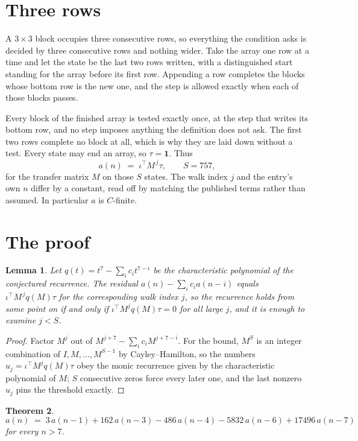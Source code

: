 \documentclass[11pt,a4paper]{article}
\theoremstyle{plain}
\newtheorem{theorem}{Theorem}
\newtheorem{lemma}[theorem]{Lemma}
\theoremstyle{definition}
\begin{document}
\section{Three rows}

A $3\times3$ block occupies three consecutive rows, so everything the condition asks is decided
by three consecutive rows and nothing wider. Take the array one row at a time and let the state
be the last two rows written, with a distinguished start standing for the array before its
first row. Appending a row completes the blocks whose bottom row is the new one, and the step
is allowed exactly when each of those blocks passes.

Every block of the finished array is tested exactly once, at the step that writes its bottom
row, and no step imposes anything the definition does not ask. The first two rows complete no
block at all, which is why they are laid down without a test. Every state may end an array, so
$\tau=\mathbf{1}$. Thus
\[
a(n)\;=\;\iota^{\!\top}M^{\,j}\tau ,\qquad S=757,
\]
for the transfer matrix $M$ on those $S$ states. The walk index $j$ and the entry's own $n$
differ by a constant, read off by matching the published terms rather than assumed. In
particular $a$ is $C$-finite.

\section{The proof}

\begin{lemma}\label{lem:crit}
Let $q(t)=t^{7}-\sum_i c_it^{7-i}$ be the characteristic polynomial of the
conjectured recurrence. The residual $a(n)-\sum_ic_ia(n-i)$ equals
$\iota^{\!\top}M^{\,j}q(M)\tau$ for the corresponding walk index $j$, so the recurrence
holds from some point on if and only if $\iota^{\!\top}M^{j}q(M)\tau=0$ for all large $j$,
and it is enough to examine $j<S$.
\end{lemma}

\begin{proof}
Factor $M^{j}$ out of $M^{j+7}-\sum_ic_iM^{j+7-i}$. For the bound, $M^{S}$
is an integer combination of $I,M,\dots,M^{S-1}$ by Cayley--Hamilton, so the numbers
$u_j=\iota^{\!\top}M^{j}q(M)\tau$ obey the monic recurrence given by the characteristic
polynomial of $M$; $S$ consecutive zeros force every later one, and the last nonzero $u_j$
pins the threshold exactly.
\end{proof}

\begin{theorem}
\[
a(n)\;=\;3\,a(n-1) + 162\,a(n-3) - 486\,a(n-4) - 5832\,a(n-6) + 17496\,a(n-7)
\]
for every $n>7$.
\end{theorem}
\end{document}
